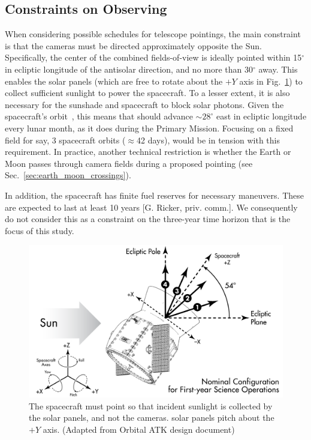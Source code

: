 \subsection{Constraints on \tesss Observing}
\label{sec:constraints_on_pointings}

When considering possible schedules for telescope pointings, the main
constraint is that the cameras must be directed approximately opposite
the Sun.  Specifically, the center of the combined fields-of-view is
ideally pointed within 15$^\circ$ in ecliptic longitude of the antisolar 
direction, and no more than 30$^\circ$ away.
This enables the solar panels (which are free to rotate
about the $+Y$ axis in Fig.~\ref{fig:spacecraft_angles}) to collect
sufficient sunlight to power the spacecraft.
To a lesser extent, it is also necessary for the sunshade and 
spacecraft to block solar photons.
Given the spacecraft's orbit~\citep{gangestad_high_2013},
this means that \tess should advance $\sim$$28^\circ$ east in ecliptic
longitude every lunar month, as it does during the Primary Mission.
Focusing on a fixed field for say, 3 spacecraft orbits ($\approx$42
days), would be in tension with this requirement.  In practice,
another technical restriction is whether the Earth or Moon passes
through \tesss camera fields during a proposed pointing (see
Sec.~\ref{sec:earth_moon_crossings}).

In addition, the spacecraft has finite fuel reserves for necessary maneuvers.
These are expected to last at least 10 years [G. Ricker, priv. comm.]. We 
consequently do not consider this as a constraint on the three-year time 
horizon that is the focus of this study.

\begin{figure}[!b]
	\centering
	\includegraphics{figures/spacecraft_angles.pdf}
	\caption{The spacecraft must point so that incident sunlight is collected 
		by the solar panels, and not the cameras. \tesss solar panels pitch 
		about the $+Y$ axis. (Adapted from Orbital ATK design document) }
	\label{fig:spacecraft_angles}
\end{figure}
